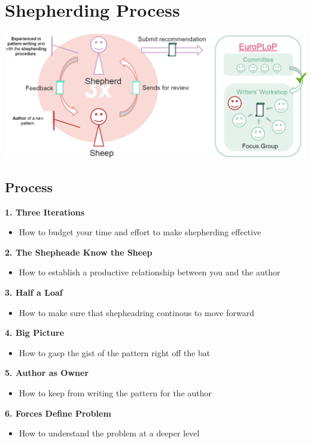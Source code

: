 \section{Shepherding Process}
\includegraphics[width=\linewidth]{./img/shepherding.png}
\subsection{Process}
\textbf{1. Three Iterations}
\begin{itemize}
    \item How to budget your time and effort to make shepherding effective
\end{itemize}
\textbf{2. The Shepheade Know the Sheep}
\begin{itemize}
    \item How to establish a productive relationship between you and the author
\end{itemize}
\textbf{3. Half a Loaf}
\begin{itemize}
    \item How to make sure that shepheadring continous to move forward
\end{itemize}
\textbf{4. Big Picture}
\begin{itemize}
    \item How to gasp the gist of the pattern right off the bat
\end{itemize}
\textbf{5. Author as Owner}
\begin{itemize}
    \item How to keep from writing the pattern for the author
\end{itemize}
\textbf{6. Forces Define Problem}
\begin{itemize}
    \item How to understand the problem at a deeper level
\end{itemize}

